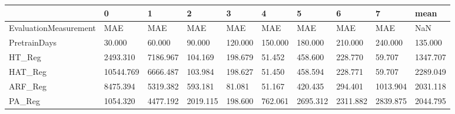 \begin{tabular}{llllllllll}
\toprule
{} &         0 &        1 &        2 &       3 &       4 &        5 &        6 &        7 &     mean \\
\midrule
EvaluationMeasurement &       MAE &      MAE &      MAE &     MAE &     MAE &      MAE &      MAE &      MAE &      NaN \\
PretrainDays          &    30.000 &   60.000 &   90.000 & 120.000 & 150.000 &  180.000 &  210.000 &  240.000 &  135.000 \\
HT\_Reg                &  2493.310 & 7186.967 &  104.169 & 198.679 &  51.452 &  458.600 &  228.770 &   59.707 & 1347.707 \\
HAT\_Reg               & 10544.769 & 6666.487 &  103.984 & 198.627 &  51.450 &  458.594 &  228.771 &   59.707 & 2289.049 \\
ARF\_Reg               &  8475.394 & 5319.382 &  593.181 &  81.081 &  51.167 &  420.435 &  294.401 & 1013.904 & 2031.118 \\
PA\_Reg                &  1054.320 & 4477.192 & 2019.115 & 198.600 & 762.061 & 2695.312 & 2311.882 & 2839.875 & 2044.795 \\
\bottomrule
\end{tabular}
